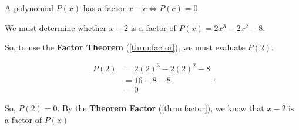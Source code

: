 
\begin{theorem}[Factor]
  \label{thrm:factor}

  A polynomial $P(x)$ has a factor $x - c \iff P(c) = 0$.
\end{theorem}

\begin{example}
  \label{exm:factor}

  We must determine whether $x - 2$ is a factor of $P(x) = 2x^{3} - 2x^{2} - 8$.

  So, to use the \textbf{Factor Theorem} (\ref{thrm:factor}), we must evaluate
  $P(2)$.

  \begin{equation}
    \label{eqt:factor}
    \begin{split}
      P(2)  &= 2(2)^{3} - 2(2)^{2} - 8 \\
            &= 16 - 8 - 8 \\
            &= 0
    \end{split}
  .\end{equation}

  So, $P(2) = 0$. By the \textbf{Theorem Factor} (\ref{thrm:factor}), we know
  that $x - 2$ is a factor of $P(x)$
\end{example}

\newpage

